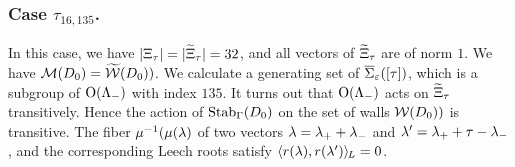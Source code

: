 \documentclass{amsart} %
\begin{document}
\subsubsection{Case $\tau_{16, 135}$.}
In this case,
we have $|\Xi_{\tau}|=|\widetilde{\Xi}_{\tau}|=32$,
and all vectors of $\widetilde{\Xi}_{\tau}$ are of norm $1$.
We have $\mathord{\mathcal{M}}(D_0)=\widetilde{\mathord{\mathcal{W}}}(D_0))$.
We calculate a generating set of $\overline{\Sigma}_{\varepsilon} ([\tau])$,
which is a subgroup of $ \mathord{\mathrm{O}}(\Lambda_{-})$ with index $135$.
It turns out that $ \mathord{\mathrm{O}}(\Lambda_{-})$ acts on $\widetilde{\Xi}_{\tau}$  transitively.
Hence the action of $\operatorname{Stab}_{\Gamma}(D_0)$ on  the set of walls $\mathord{\mathcal{W}}(D_0))$ is transitive.
The fiber 
 $\mu^{-1}(\mu(\lambda)$ 
of two vectors
$\lambda={\lambda}_{+}+{\lambda}_{-}$ and $\lambda^{\prime}={\lambda}_{+}+\tau-{\lambda}_{-}$, and 
the corresponding Leech roots 
 satisfy
$\langle r(\lambda), r(\lambda^{\prime}) \rangle_{\hskip -1pt L}=0$.
%
%
%



%
\end{document}
